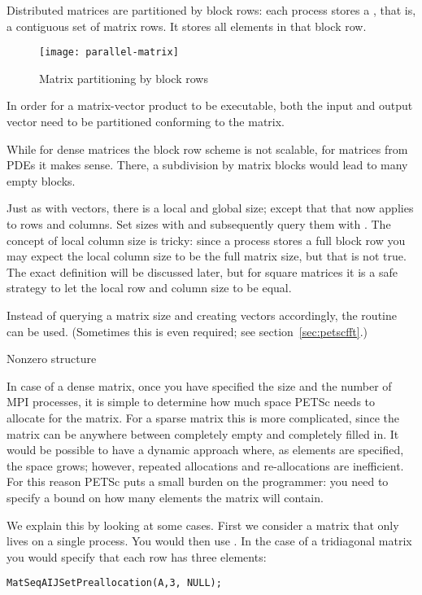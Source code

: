 Distributed matrices are partitioned by block rows: each process
stores a , that is, a contiguous set of matrix
rows. It stores all elements in that block row.
%
\begin{figure}[ht]
  \texttt{[image: parallel-matrix]}
  \caption{Matrix partitioning by block rows}
  \label{fig:parallel-matrix}
\end{figure}
%
In order for a matrix-vector product to be executable, both the input
and output vector need to be partitioned conforming to the matrix.

While for dense matrices the block row scheme is not scalable, for
matrices from \acp{PDE} it makes sense. There, a subdivision by matrix
blocks would lead to many empty blocks.

Just as with vectors, there is a local and global size; except that
that now applies to rows and columns.
Set sizes with
and subsequently query them with
.
The concept of local column size is tricky:
since a process stores a full block row you may expect the local column size
to be the full matrix size, but that is not true.
The exact definition will be discussed later, but for square matrices it is a safe
strategy to let the local row and column size to be equal.

Instead of querying a matrix size and creating vectors accordingly,
the routine  can be used.
(Sometimes this is even required; see section~\ref{sec:petscfft}.)

 {Nonzero structure}

In case of a dense matrix, once you have specified the size and the
number of MPI processes, it is simple to determine how much space PETSc
needs to allocate for the matrix. For a sparse matrix this is more
complicated, since the matrix can be anywhere between completely empty
and completely filled in. It would be possible to have a dynamic
approach where, as elements are specified, the space grows; however,
repeated allocations and re-allocations are inefficient. For this
reason PETSc puts a small burden on the programmer: you need to
specify a bound on how many elements the matrix will contain.

We explain this by looking at some cases. First we consider a matrix
that only lives on a single process. You would then use
.  In
the case of a tridiagonal matrix you would specify that each row has
three elements:
%
\begin{lstlisting}
MatSeqAIJSetPreallocation(A,3, NULL);
\end{lstlisting}

